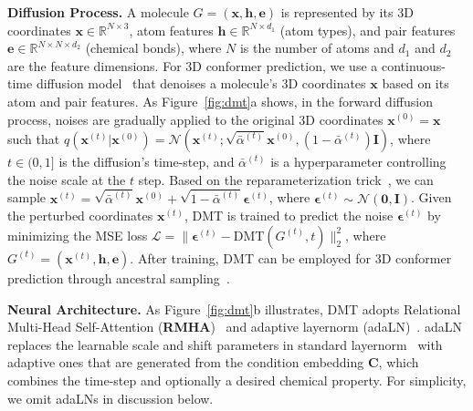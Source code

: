 \textbf{Diffusion Process.} A molecule $G=(\mathbf{x}, \mathbf{h}, \mathbf{e})$ is represented by its 3D coordinates $\mathbf{x}\in \mathbb{R}^{N\times 3}$, atom features $\mathbf{h}\in \mathbb{R}^{N\times d_1}$ (\eg atom types), and pair features $\mathbf{e}\in \mathbb{R}^{N\times N\times d_2}$ (\eg chemical bonds), where $N$ is the number of atoms and $d_1$ and $d_2$ are the feature dimensions. For 3D conformer prediction, we use a continuous-time diffusion model~\citep{VDM} that denoises a molecule's 3D coordinates $\mathbf{x}$ based on its atom and pair features. As Figure~\ref{fig:dmt}a shows, in the forward diffusion process, noises are gradually applied to the original 3D coordinates $\mathbf{x}^{(0)}=\mathbf{x}$ such that $q(\mathbf{x}^{(t)}|\mathbf{x}^{(0)}) = \mathcal{N}(\mathbf{x}^{(t)};\sqrt{\bar{\alpha}^{(t)}}\mathbf{x}^{(0)},(1-\bar{\alpha}^{(t)})\mathbf{I})$, where $t\in (0,1]$ is the diffusion's time-step, and $\bar{\alpha}^{(t)}$ is a hyperparameter controlling the noise scale at the $t$ step. Based on the reparameterization trick~\citep{DDPM}, we can sample $\mathbf{x}^{(t)} = \sqrt{\bar{\alpha}^{(t)}}\mathbf{x}^{(0)} + \sqrt{1-\bar{\alpha}^{(t)}}\boldsymbol{\epsilon}^{(t)}$, where $\boldsymbol{\epsilon}^{(t)}\sim \mathcal{N}(\mathbf{0},\mathbf{I})$. Given the perturbed coordinates $\mathbf{x}^{(t)}$, DMT is trained to predict the noise $\boldsymbol{\epsilon}^{(t)}$ by minimizing the MSE loss $\mathcal{L}=\|\boldsymbol{\epsilon}^{(t)}-\text{DMT}(G^{(t)}, t)\|^2_2$, where $G^{(t)}=(\mathbf{x}^{(t)}, \mathbf{h}, \mathbf{e})$.
After training, DMT can be employed for 3D conformer prediction through ancestral sampling~\citep{DDPM}.


\textbf{Neural Architecture.} As Figure~\ref{fig:dmt}b illustrates, DMT adopts Relational Multi-Head Self-Attention (\textbf{RMHA})~\citep{JODO} and adaptive layernorm (adaLN)~\citep{Film,DiT}. adaLN replaces the learnable scale and shift parameters in standard layernorm~\citep{ba2016layer} with adaptive ones that are generated from the condition embedding $\mathbf{C}$, which combines the time-step and optionally a desired chemical property.
For simplicity, we omit adaLNs in discussion below.

